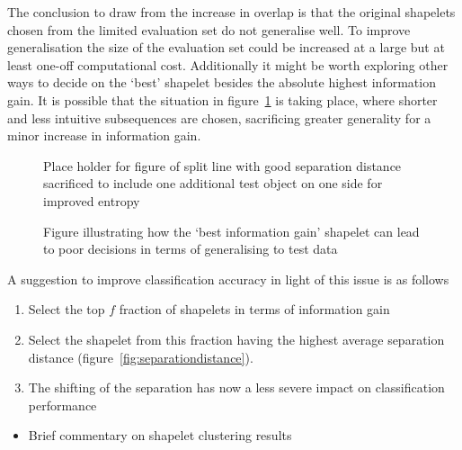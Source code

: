 The conclusion to draw from the increase in overlap is that the original shapelets chosen from the limited evaluation set do not generalise well. To improve generalisation the size of the evaluation set could be increased at a large but at least one-off computational cost. Additionally it might be worth exploring other ways to decide on the `best' shapelet besides the absolute highest information gain. It is possible that the situation in figure~\ref{fig:poorchoice} is taking place, where shorter and less intuitive subsequences are chosen, sacrificing greater generality for a minor increase in information gain.

\begin{figure}
	\label{fig:poorchoice}
	Place holder for figure of split line with good separation distance sacrificed to include one additional test object on one side for improved entropy
	\caption{Figure illustrating how the `best information gain' shapelet can lead to poor decisions in terms of generalising to test data}
\end{figure}

A suggestion to improve classification accuracy in light of this issue is as follows
\begin{enumerate}
	\item Select the top $f$ fraction of shapelets in terms of information gain
	\item Select the shapelet from this fraction having the highest average separation distance (figure~\ref{fig:separationdistance}).
	\item The shifting of the separation has now a less severe impact on classification performance
\end{enumerate}

\begin{itemize}
	\item Brief commentary on shapelet clustering results
\end{itemize}

